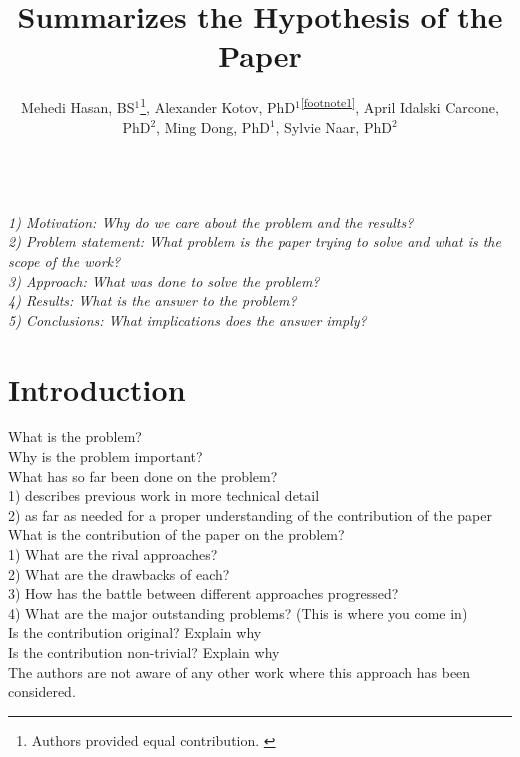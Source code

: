 \documentclass{amia}
\begin{document}
\title{Summarizes the Hypothesis of the Paper}

\author{Mehedi Hasan, BS$^{1}$\footnote[1]{Authors provided equal contribution. \label{footnote1}}, Alexander Kotov, PhD$^{1}$\textsuperscript{\ref{footnote1}}, April Idalski Carcone, PhD$^{2}$, Ming Dong, PhD$^{1}$, Sylvie Naar, PhD$^{2}$}


\maketitle

\textit{\\
1) Motivation: Why do we care about the problem and the results? \\
2) Problem statement: What problem is the paper trying to solve and what is the scope of the work? \\
3) Approach: What was done to solve the problem? \\
4) Results: What is the answer to the problem? \\
5) Conclusions: What implications does the answer imply?}

\section*{Introduction}

What is the problem? \\
Why is the problem important? \\
What has so far been done on the  problem?\\
1) describes previous work in more technical detail \\
2) as far as needed for a proper understanding of the contribution of the paper \\
What is the contribution of the paper on the problem?\\
1) What are the rival approaches? \\
2) What are the drawbacks of each?\\
3) How has the battle between different approaches progressed?\\
4) What are the major outstanding problems? (This is where you come in)\\
Is the contribution original? Explain why \\
Is the contribution non-trivial? Explain why \\
The authors are not aware of any other work where this approach has been considered.
\end{document}
